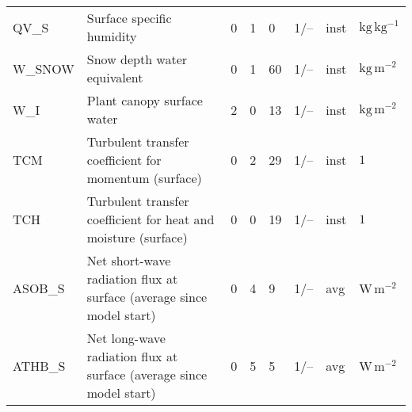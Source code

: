 \begin{longtable}{p{2.0cm}p{5.0cm}p{0.7cm}p{0.7cm}p{0.7cm}p{1.4cm}p{1cm}p{1cm}}
QV\_S                          &  Surface specific humidity                                                             &               0                                   &                     1                       &                    0                       &                 1/--                            &                      inst                   &        $\mathrm{kg\,kg^{-1}}$    \\
W\_SNOW                        &  Snow depth water equivalent                                                           &               0                                   &                     1                       &                    60                      &                 1/--                            &                      inst                   &        $\mathrm{kg\,m^{-2}}$    \\
W\_I                           &  Plant canopy surface water                                                            &               2                                   &                     0                       &                    13                      &                 1/--                            &                      inst                   &        $\mathrm{kg\,m^{-2}}$    \\
TCM                            &  Turbulent transfer coefficient for momentum (surface)                                 &               0                                   &                     2                       &                    29                      &                 1/--                            &                      inst                   &        $1$    \\ 
TCH                            &  Turbulent transfer coefficient for heat and moisture (surface)                        &               0                                   &                     0                       &                    19                      &                 1/--                            &                      inst                   &        $1$    \\
ASOB\_S                        &  Net short-wave radiation flux at surface (average since model start)                  &               0                                   &                     4                       &                     9                      &                 1/--                            &                      avg                    &        $\mathrm{W\,m^{-2}}$    \\
ATHB\_S                        &  Net long-wave radiation flux at surface (average since model start)                   &               0                                   &                     5                       &                     5                      &                 1/--                            &                      avg                    &        $\mathrm{W\,m^{-2}}$    \\

\end{longtable}
